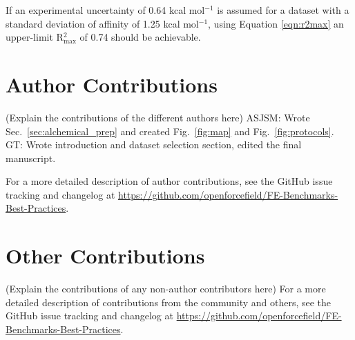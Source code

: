\documentclass[9pt,bestpractices]{livecoms}
\newcommand{\githubrepository}{\url{https://github.com/openforcefield/FE-Benchmarks-Best-Practices}}  %
\begin{document}
If an experimental uncertainty of 0.64 kcal mol$^{-1}$ is assumed for a dataset with a standard deviation of affinity of 1.25 kcal mol$^{-1}$, using Equation \ref{eqn:r2max} an upper-limit R$^2_{\mathrm{max}}$ of 0.74 should be achievable.


\section{Author Contributions}
%

(Explain the contributions of the different authors here)
ASJSM: Wrote Sec.~\ref{sec:alchemical_prep} and created Fig.~\ref{fig:map} and Fig.~\ref{fig:protocols}. 
GT: Wrote introduction and dataset selection section, edited the final manuscript.


For a more detailed description of author contributions,
see the GitHub issue tracking and changelog at \githubrepository.


\section{Other Contributions}
%

(Explain the contributions of any non-author contributors here)
For a more detailed description of contributions from the community and others, see the GitHub issue tracking and changelog at \githubrepository.
\end{document}

